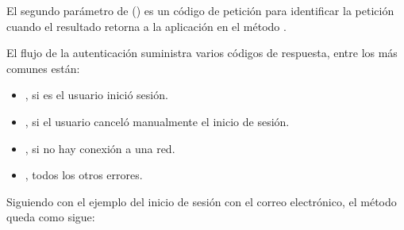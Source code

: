 El segundo parámetro de  ()  es un
código de petición para identificar la petición cuando el resultado retorna
a la aplicación en el método .

El flujo de la autenticación suministra varios códigos de respuesta, entre
los más comunes están:
\begin{itemize}
\item {} 
, si es el usuario inició sesión.

\item {} 
, si el usuario canceló manualmente el inicio de sesión.

\item {} 
, si no hay conexión a una red.

\item {} 
,  todos los otros errores.

\end{itemize}

Siguiendo con el ejemplo del inicio de sesión con el correo electrónico,
el método  queda como sigue:

